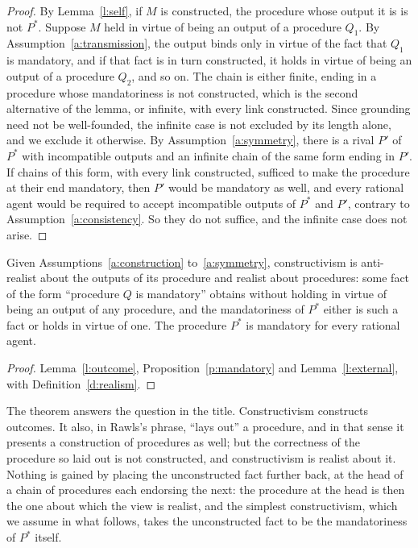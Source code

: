 \documentclass{situationist-preprint}
\begin{document}
\begin{proof}
By Lemma~\ref{l:self}, if $M$ is constructed, the procedure whose output it is is not $P^*$. Suppose $M$ held in virtue of being an output of a procedure $Q_1$. By Assumption~\ref{a:transmission}, the output binds only in virtue of the fact that $Q_1$ is mandatory, and if that fact is in turn constructed, it holds in virtue of being an output of a procedure $Q_2$, and so on. The chain is either finite, ending in a procedure whose mandatoriness is not constructed, which is the second alternative of the lemma, or infinite, with every link constructed. Since grounding need not be well-founded, the infinite case is not excluded by its length alone, and we exclude it otherwise. By Assumption~\ref{a:symmetry}, there is a rival $P'$ of $P^*$ with incompatible outputs and an infinite chain of the same form ending in $P'$. If chains of this form, with every link constructed, sufficed to make the procedure at their end mandatory, then $P'$ would be mandatory as well, and every rational agent would be required to accept incompatible outputs of $P^*$ and $P'$, contrary to Assumption~\ref{a:consistency}. So they do not suffice, and the infinite case does not arise.
\end{proof}

\begin{theorem}\label{t:main}
Given Assumptions~\ref{a:construction} to~\ref{a:symmetry}, constructivism is anti-realist about the outputs of its procedure and realist about procedures: some fact of the form \enquote{procedure $Q$ is mandatory} obtains without holding in virtue of being an output of any procedure, and the mandatoriness of $P^*$ either is such a fact or holds in virtue of one. The procedure $P^*$ is mandatory for every rational agent.
\end{theorem}

\begin{proof}
Lemma~\ref{l:outcome}, Proposition~\ref{p:mandatory} and Lemma~\ref{l:external}, with Definition~\ref{d:realism}.
\end{proof}

The theorem answers the question in the title. Constructivism constructs outcomes. It also, in Rawls's phrase, \enquote{lays out} a procedure, and in that sense it presents a construction of procedures as well; but the correctness of the procedure so laid out is not constructed, and constructivism is realist about it. Nothing is gained by placing the unconstructed fact further back, at the head of a chain of procedures each endorsing the next: the procedure at the head is then the one about which the view is realist, and the simplest constructivism, which we assume in what follows, takes the unconstructed fact to be the mandatoriness of $P^*$ itself.
\end{document}
